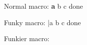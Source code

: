 \documentclass{article}
\def\foo#1{\textbf{#1}}
\def\bar#1#{\textbf{#1}}
\def\baz#{\textit{a b c} }
\begin{document}
Normal macro: \foo a b c {done}

Funky macro: \bar a b c {done}

Funkier macro: 
\end{document}
